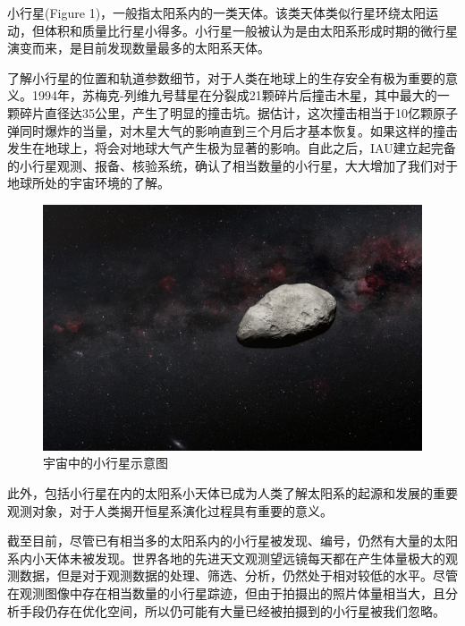 \documentclass[12pt,a4paper]{article}%
\begin{document}
小行星(Figure 1)，一般指太阳系内的一类天体。该类天体类似行星环绕太阳运动，但体积和质量比行星小得多。小行星一般被认为是由太阳系形成时期的微行星演变而来，是目前发现数量最多的太阳系天体。

了解小行星的位置和轨道参数细节，对于人类在地球上的生存安全有极为重要的意义。1994年，苏梅克-列维九号彗星在分裂成21颗碎片后撞击木星，其中最大的一颗碎片直径达35公里，产生了明显的撞击坑。据估计，这次撞击相当于10亿颗原子弹同时爆炸的当量，对木星大气的影响直到三个月后才基本恢复。如果这样的撞击发生在地球上，将会对地球大气产生极为显著的影响。自此之后，IAU建立起完备的小行星观测、报备、核验系统，确认了相当数量的小行星，大大增加了我们对于地球所处的宇宙环境的了解。

\begin{figure}[H]%
    \centering
    \begin{minipage}{0.7\textwidth}%
        \centering
        \includegraphics[width=1.0%
            \textwidth]{asteroid}%
        \caption{\fontsize{10pt}{15pt}\selectfont 宇宙中的小行星示意图}%
    \end{minipage}
\end{figure}

此外，包括小行星在内的太阳系小天体已成为人类了解太阳系的起源和发展的重要观测对象，对于人类揭开恒星系演化过程具有重要的意义。

截至目前，尽管已有相当多的太阳系内的小行星被发现、编号，仍然有大量的太阳系内小天体未被发现。世界各地的先进天文观测望远镜每天都在产生体量极大的观测数据，但是对于观测数据的处理、筛选、分析，仍然处于相对较低的水平。尽管在观测图像中存在相当数量的小行星踪迹，但由于拍摄出的照片体量相当大，且分析手段仍存在优化空间，所以仍可能有大量已经被拍摄到的小行星被我们忽略。
\end{document}
